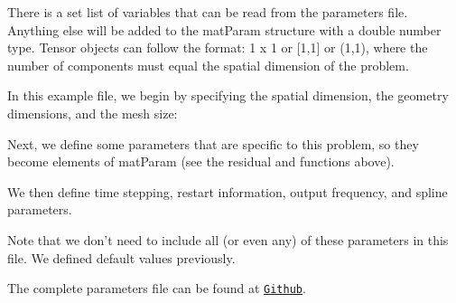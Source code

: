 There is a set list of variables that can be read from the parameters file. Anything else will be added to the {\ttfamily mat\-Param} structure with a double number type. Tensor objects can follow the format\-: 1 x 1 or \mbox{[}1,1\mbox{]} or (1,1), where the number of components must equal the spatial dimension of the problem.

In this example file, we begin by specifying the spatial dimension, the geometry dimensions, and the mesh size\-:


\begin{DoxyCodeInclude}

\end{DoxyCodeInclude}


Next, we define some parameters that are specific to this problem, so they become elements of {\ttfamily mat\-Param} (see the {\ttfamily residual} and  functions above).


\begin{DoxyCodeInclude}

\end{DoxyCodeInclude}


We then define time stepping, restart information, output frequency, and spline parameters.


\begin{DoxyCodeInclude}

\end{DoxyCodeInclude}


Note that we don't need to include all (or even any) of these parameters in this file. We defined default values previously.

The complete parameters file can be found at \href{https://github.com/mechanoChem/mechanoChemIGA/blob/master/initBounValProbs/CahnHilliard_oneSpecies/2D/parameters.prm}{\tt Github}. 